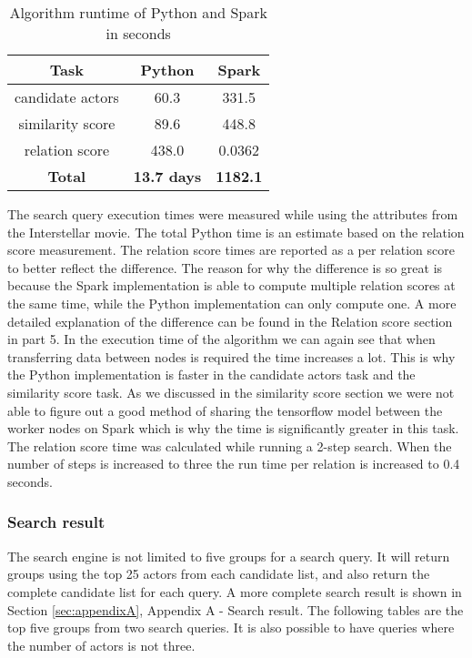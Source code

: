 \begin{table}[H]
	\centering
    \begin{tabular}{ |c|c|c| } 
        \hline
        \textbf{Task} & \textbf{Python} & \textbf{Spark} \\ 
        \hline
        candidate actors & 60.3 & 331.5 \\ 
        similarity score & 89.6 & 448.8 \\ 
        relation score & 438.0 & 0.0362 \\ \hline
        \textbf{Total} & \textbf{13.7 days} & \textbf{1182.1} \\ 
        \hline
    \end{tabular}
	\caption{Algorithm runtime of Python and Spark in seconds}
	\label{tab:algorithm runtime}
\end{table}



The search query execution times were measured while using the attributes from the Interstellar movie. The total Python time is an estimate based on the relation score measurement. The relation score times are reported as a per relation score to better reflect the difference. The reason for why the difference is so great is because the Spark implementation is able to compute multiple relation scores at the same time, while the Python implementation can only compute one. A more detailed explanation of the difference can be found in the Relation score section in part 5. In the execution time of the algorithm we can again see that when transferring data between nodes is required the time increases a lot. This is why the Python implementation is faster in the candidate actors task and the similarity score task. As we discussed in the similarity score section we were not able to figure out a good method of sharing the tensorflow model between the worker nodes on Spark which is why the time is significantly greater in this task. The relation score time was calculated while running a 2-step search. When the number of steps is increased to three the run time per relation is increased to 0.4 seconds.



\subsubsection{Search result}

The search engine is not limited to five groups for a search query. It will return groups using the top 25 actors from each candidate list, and also return the complete candidate list for each query. A more complete search result is shown in Section \ref{sec:appendixA}, Appendix A - Search result. The following tables are the top five groups from two search queries. It is also possible to have queries where the number of actors is not three. 



